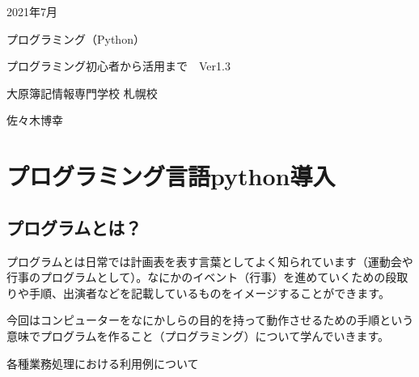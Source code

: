 \documentclass[11pt,a4paper,dvipdfmx,titlepage]{jsreport}
\begin{document}
\begin{center}
  \huge 2021年7月　\par
  \vspace{15mm}
  \huge プログラミング（Python） \par
  \vspace{15mm}
  \LARGE  プログラミング初心者から活用まで　Ver1.3\par
  \vspace{100mm}
\end{center}
 
\begin{flushright}
 \Large 大原簿記情報専門学校 札幌校 \par
  \vspace{15mm}
  \Large 佐々木博幸 \par
  \vspace{10mm}
\end{flushright}
\thispagestyle{empty}
\clearpage
\addtocounter{page}{-1}
\newpage

\tableofcontents
\printindex
\chapter{プログラミング言語python導入}

\section{プログラムとは？}
プログラムとは日常では計画表を表す言葉としてよく知られています（運動会や行事のプログラムとして）。なにかのイベント（行事）を進めていくための段取りや手順、出演者などを記載しているものをイメージすることができます。



今回はコンピューターをなにかしらの目的を持って動作させるための手順という意味でプログラムを作ること（プログラミング）について学んでいきます。


各種業務処理における利用例について
\end{document}
